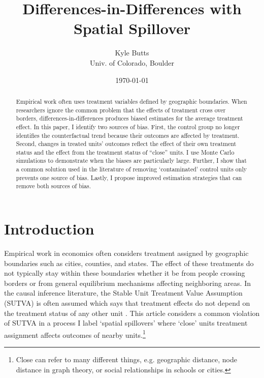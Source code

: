 \documentclass[11pt]{article}
\title{\color{dark-maroon} Differences-in-Differences with Spatial Spillover}
\author{\normalsize Kyle Butts\\{\footnotesize Univ. of Colorado, Boulder}}
\date{\footnotesize\today}
\begin{document}
\begin{titlepage}
    \maketitle
    
    \begin{abstract}
        Empirical work often uses treatment variables defined by geographic boundaries. When researchers ignore the common problem that the effects of treatment cross over borders, differences-in-differences produces biased estimates for the average treatment effect. In this paper, I identify two sources of bias. First, the control group no longer identifies the counterfactual trend because their outcomes are affected by treatment. Second, changes in treated units' outcomes reflect the effect of their own treatment status and the effect from the treatment status of ``close'' units. I use Monte Carlo simulations to demonstrate when the biases are particularly large. Further, I show that a common solution used in the literature of removing `contaminated' control units only prevents one source of bias. Lastly, I propose improved estimation strategies that can remove both sources of bias.  
    \end{abstract}
\end{titlepage}
    
\newpage 

\section{Introduction}

Empirical work in economics often considers treatment assigned by geographic boundaries such as cities, counties, and states. The effect of these treatments do not typically stay within these boundaries whether it be from people crossing borders or from general equilibrium mechanisms affecting neighboring areas. In the causal inference literature, the Stable Unit Treatment Value Assumption (SUTVA) is often assumed which says that treatment effects do not depend on the treatment status of any other unit \citep{Rubin_1980}. This article considers a common violation of SUTVA in a process I label `spatial spillovers' where `close' units treatment assignment affects outcomes of nearby units.\footnote{Close can refer to many different things, e.g. geographic distance, node distance in graph theory, or social relationships in schools or cities.} 
\end{document}
